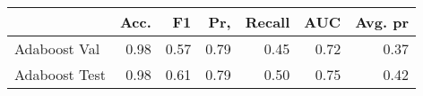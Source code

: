 \begin{tabular}{lrrrrrr}
\toprule
{} &  Acc. &    F1 &   Pr, &  Recall &   AUC &  Avg. pr \\
\midrule
Adaboost Val  &  0.98 &  0.57 &  0.79 &    0.45 &  0.72 &     0.37 \\
Adaboost Test &  0.98 &  0.61 &  0.79 &    0.50 &  0.75 &     0.42 \\
\bottomrule
\end{tabular}
